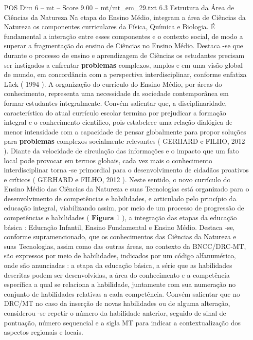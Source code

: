 \begin{textsample}{POS Dim 6 – mt – Score 9.00 – mt/mt\_em\_29.txt}  \label{ex:f6_pos_162}
6.3 Estrutura da Área de Ciências da Natureza Na etapa do Ensino Médio, integram a área de Ciências da Natureza os componentes curriculares da Física, Química e Biologia.
É fundamental a interação entre esses componentes e o contexto social, de modo a superar a fragmentação do ensino de Ciências no Ensino Médio.
Destaca -se que durante o processo de ensino e aprendizagem de Ciências os estudantes precisam ser instigados a enfrentar \textbf{problemas} complexos, amplos e em uma visão global de mundo, em concordância com a perspectiva interdisciplinar, conforme enfatiza Lück ( 1994 ).
A organização do currículo do Ensino Médio, por áreas do conhecimento, representa uma necessidade da sociedade contemporânea em formar estudantes integralmente.
Convém salientar que, a disciplinaridade, característica do atual currículo escolar termina por prejudicar a formação integral e o conhecimento científico, pois estabelece uma relação dialógica de menor intensidade com a capacidade de pensar globalmente para propor soluções para \textbf{problemas} complexos socialmente relevantes ( GERHARD e FILHO, 2012 ).
Diante da velocidade de circulação das informações e o impacto que um fato local pode provocar em termos globais, cada vez mais o conhecimento interdisciplinar torna -se primordial para o desenvolvimento de cidadãos proativos e críticos ( GERHARD e FILHO, 2012 ).
Neste sentido, o novo currículo do Ensino Médio das Ciências da Natureza e suas Tecnologias está organizado para o desenvolvimento de competências e habilidades, e articulado pelo princípio da educação integral, viabilizando assim, por meio de um processo de progressão de competências e habilidades ( \textbf{Figura} 1 ), a integração das etapas da educação básica : Educação Infantil, Ensino Fundamental e Ensino Médio.
Destaca -se, conforme supramencionado, que os conhecimentos das Ciências da Natureza e suas Tecnologias, assim como das outras áreas, no contexto da BNCC/DRC-MT, são expressos por meio de habilidades, indicados por um código alfanumérico, onde são anunciadas : a etapa da educação básica, a série que as habilidades descritas podem ser desenvolvidas, a área do conhecimento e a competência específica a qual se relaciona a habilidade, juntamente com sua numeração no conjunto de habilidades relativas a cada competência.
Convém salientar que no DRC/MT no caso da inserção de novas habilidades ou de alguma alteração, considerou -se repetir o número da habilidade anterior, seguido de sinal de pontuação, número sequencial e a sigla MT para indicar a contextualização dos aspectos regionais e locais.

\end{textsample}

